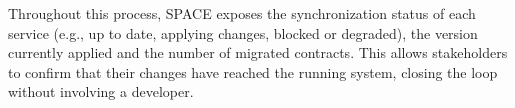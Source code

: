 Throughout this process, SPACE exposes the synchronization status of each service (e.g., up to date, applying changes, blocked or degraded), the version currently applied and the number of migrated contracts. This allows stakeholders to confirm that their changes have reached the running system, closing the loop without involving a developer.
